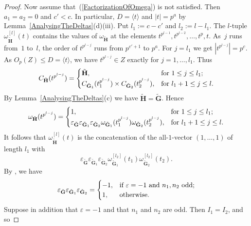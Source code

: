 \documentclass[12pt]{amsart}
\newcommand{\bG}{{\mathbf{G}}}      %
\newcommand{\bH}{{\mathbf{H}}}
\theoremstyle{theorem}
\theoremstyle{definition}
\theoremstyle{remark}
\begin{document}
\begin{proof}
Now assume that~(\ref{FactorizationOfOmega}) is not satisfied. Then
$a_1 = a_2 = 0$ and $c' < c$. In particular, $D = \langle t \rangle$ and 
$|t| = p^a$ by Lemma~\ref{AnalysingTheDeltas}(d)(iii). Put $l_1 := c - c'$ and 
$l_2 := l - l_1$. The $l$-tuple
$\omega_{\tilde{\bH}}^{[l]}( t )$ contains the values of $\omega_{\tilde{\bH}}$
at the elements $t^{p^{l-1}}, t^{p^{l-2}}, \ldots , t^p, t$. As~$j$ runs 
from~$1$ to~$l$, the order of $t^{p^{l-j}}$ runs from $p^{c' + 1}$ to $p^{a}$. 
For $j = l_1$ we get $|t^{p^{l-j}}| = p^{c}$.
As $O_p( Z ) \leq D = \langle t \rangle$, we have
$t^{p^{l-j}} \in Z$ exactly for $j = 1, \ldots , l_1$. 
Thus 
\begin{equation}
\label{FactorizationOfCentralizer}
C_{\tilde{\bH}}( t^{p^{l-j}} ) = 
\begin{cases}
{\tilde{\bH}}, & \text{\rm for\ } 1 \leq j \leq l_1; \\
C_{\tilde{\bG}_1}( t_1^{p^{l-j}} ) \times C_{\tilde{\bG}_2}( t_2^{p^{l-j}} ), & 
\text{\rm for\ } l_1 + 1 \leq j \leq l.
\end{cases}
\end{equation}
By Lemma~\ref{AnalysingTheDeltas}(c) we have $\tilde{\bH} = \tilde{\bG}$. Hence
\begin{equation}
\label{PartialFactorizationOfOmega}
\omega_{\tilde{\bH}}( t^{p^{l-j}} ) = 
\begin{cases}
1, & \text{\rm for\ } 1 \leq j \leq l_1; \\
\varepsilon_{\tilde{\bG}} \varepsilon_{\tilde{\bG}_1} \varepsilon_{\tilde{\bG}_2}
\omega_{\tilde{\bG}_1}( t_1^{p^{l-j}} ) \omega_{\tilde{\bG}_2}( t_2^{p^{l-j}} ),
& \text{\rm for\ } l_1 + 1 \leq j \leq l.
\end{cases}
\end{equation}
It follows that $\omega_{\tilde{\bH}}^{[l]}( t )$ is the concatenation of the 
all-$1$-vector $(1, \ldots , 1)$ of length $l_1$ with
$$\varepsilon_{\tilde{\bG}} \varepsilon_{\tilde{\bG}_1} \varepsilon_{\tilde{\bG}_2}
\omega_{\tilde{\bG}_1}^{[l_2]}( t_1 ) \omega_{\tilde{\bG}_2}^{[l_2]}( t_2 ).$$
By \cite[Example~$2.5.5$]{HL25}, we have
$$\varepsilon_{\tilde{\bG}} \varepsilon_{\tilde{\bG}_1} \varepsilon_{\tilde{\bG}_2} =
\begin{cases}
-1, & \text{\rm if}\  \varepsilon = -1 \text{\rm\ and\ } n_1, n_2 \text{\rm\ odd}; \\
 1, & \text{\rm otherwise}.
\end{cases}
$$
Suppose in addition that $\varepsilon = -1$ and that $n_1$ and $n_2$ are odd.
Then $I_1 = I_2$, and so 

\end{proof}
\end{document}
